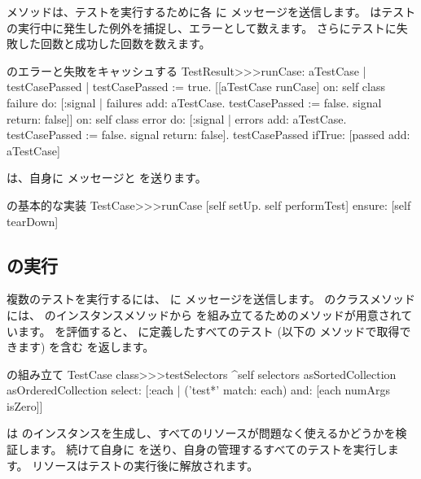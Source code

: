 \documentclass[a4paper,10pt,twoside]{book}
\begin{document}
 メソッドは、テストを実行するために各  に  メッセージを送信します。
 はテストの実行中に発生した例外を捕捉し、エラーとして数えます。
さらにテストに失敗した回数と成功した回数を数えます。

\begin{method}[testresultruncase]{ のエラーと失敗をキャッシュする}
TestResult>>>runCase: aTestCase
	| testCasePassed |
	testCasePassed := true.
	[[aTestCase runCase] 
			on: self class failure
			do: 
				[:signal | 
				failures add: aTestCase.
				testCasePassed := false.
				signal return: false]]
					on: self class error
					do:
						[:signal |
						errors add: aTestCase.
						testCasePassed := false.
						signal return: false].
	testCasePassed ifTrue: [passed add: aTestCase]
\end{method}

 は、自身に  メッセージと  を送ります。

\begin{method}[testcaseruncase]{ の基本的な実装}
TestCase>>>runCase
	[self setUp.
	self performTest] ensure: [self tearDown]
\end{method}

\subsection{ の実行}

複数のテストを実行するには、  に  メッセージを送信します。
 のクラスメソッドには、  のインスタンスメソッドから  を組み立てるためのメソッドが用意されています。
 を評価すると、  に定義したすべてのテスト (以下の  メソッドで取得できます) を含む  を返します。

\begin{method}[testcasetestselectors]{ の組み立て}
TestCase class>>>testSelectors 
	^self selectors asSortedCollection asOrderedCollection select: [:each | 
		('test*' match: each) and: [each numArgs isZero]]
\end{method}

 は  のインスタンスを生成し、すべてのリソースが問題なく使えるかどうかを検証します。
続けて自身に  を送り、自身の管理するすべてのテストを実行します。
リソースはテストの実行後に解放されます。
\end{document}
